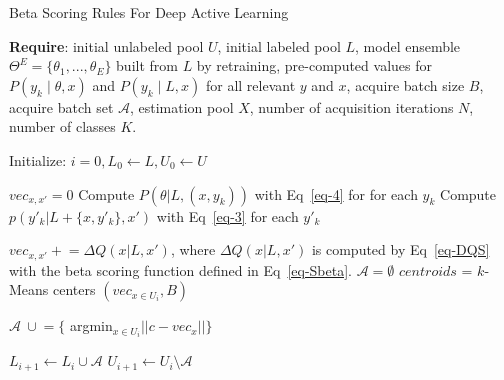 \documentclass[letterpaper]{article} %
\begin{document}
\begin{algorithm}[tb]\small
\caption{Beta Scoring Rules For Deep Active Learning}
\label{alg:alg-ensemble}

\textbf{Require}: initial unlabeled pool $U$, initial labeled pool $L$, model ensemble $\Theta^E=\{\theta_1,...,\theta_E\}$ built from $L$ by retraining, pre-computed values for $P(y_k \mid \theta,x )$ and $P(y_k \mid L, x )$ for all relevant $y$ and $x$, acquire batch size $B$, acquire batch set $\mathcal{A}$, estimation pool $X$, number of acquisition iterations $N$, number of classes $K$.
\begin{algorithmic}[1]\small
\STATE Initialize: $i=0,L_0\leftarrow L, U_0\leftarrow U$


    \STATE  $vec_{x,x'} = 0$
    \STATE
    Compute $P(\theta|L,(x,y_k))$ with Eq~\eqref{eq-4} for for each $y_k$
    \STATE
    Compute $p(y'_k|L+\{x,y'_k\},x')$ with Eq~\eqref{eq-3} for each $y'_k$

    \ENDFOR
  \STATE $vec_{x,x'} +\!\!\!=
    \Delta Q(x|L,x')$, where $\Delta Q(x|L,x')$ is computed by Eq~\eqref{eq-DQS} with
    the beta scoring function defined in Eq~\eqref{eq-Sbeta}.
    \ENDFOR
    \STATE $\mathcal{A} = \emptyset$
    \STATE $centroids$ = $k$-Means centers $(vec_{x\in U_i}, B)$

    \STATE $\mathcal{A}  ~\cup\!\!= \{$ argmin$_{x \in U_i}||c - vec_{x}|| \}$
    \ENDFOR

        \STATE $L_{i+1}\leftarrow L_i \cup \mathcal{A} $
        \STATE $U_{i+1}\leftarrow U_i \setminus \mathcal{A} $

    \ENDWHILE
  \end{algorithmic}
\end{algorithm}
\end{document}
